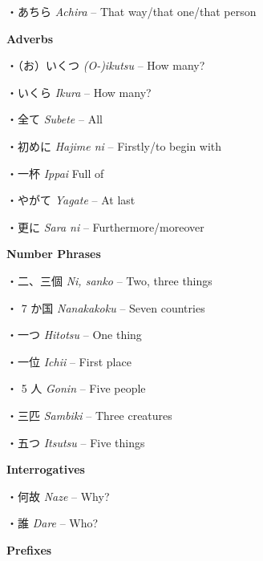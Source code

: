 \par{・あちら  \emph{Achira }– That way\slash that one\slash that person }
 
\par{\textbf{Adverbs }}
 
\par{・（お）いくつ  \emph{(O-)ikutsu }– How many? }
 
\par{・いくら  \emph{Ikura }– How many? }
 
\par{・全て  \emph{Subete }– All }
 
\par{・初めに  \emph{Hajime ni }– Firstly\slash to begin with }
 
\par{・一杯  \emph{Ippai }Full of }
 
\par{・やがて  \emph{Yagate }– At last }
 
\par{・更に  \emph{Sara ni }– Furthermore\slash moreover }
 
\par{\textbf{Number Phrases }}
 
\par{・二、三個  \emph{Ni, sanko }– Two, three things }
 
\par{・ 7 か国  \emph{Nanakakoku }– Seven countries }
 
\par{・一つ  \emph{Hitotsu }– One thing }
 
\par{・一位  \emph{Ichi\textquotesingle i }– First place }
 
\par{・ 5 人  \emph{Gonin }– Five people }
 
\par{・三匹  \emph{Sambiki }– Three creatures }
 
\par{・五つ  \emph{Itsutsu }– Five things }
 
\par{\textbf{Interrogatives }}
 
\par{・何故  \emph{Naze }– Why? }
 
\par{・誰  \emph{Dare }– Who? }
 
\par{\textbf{Prefixes }}
 
